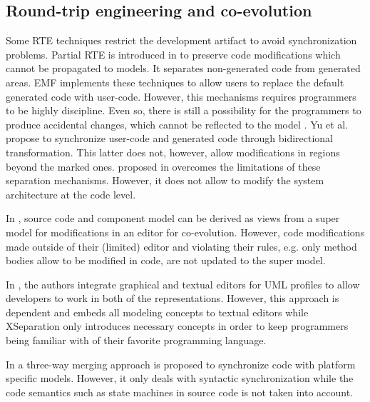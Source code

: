\subsection{Round-trip engineering and co-evolution}
Some RTE techniques restrict the development artifact to avoid
synchronization problems.
Partial RTE is introduced in \cite{czarnecki_multi-level_2006} to preserve code modifications which cannot be propagated to models.
It separates non-generated code from generated areas. 
EMF implements these techniques to allow users to replace the default generated code with user-code.
However, this mechanisms requires programmers to be highly discipline.
Even so, there is still a possibility for the programmers to produce accidental changes, which cannot be reflected to the model \cite{zheng2012enhancing}.
Yu et al. \cite{yu2012maintaining} propose to synchronize user-code and generated code through bidirectional transformation.
This latter does not, however, allow modifications in regions beyond the marked ones. 
 proposed in \cite{zheng2012enhancing} overcomes the limitations of these separation mechanisms.
However, %
it does not allow to modify the system architecture at the code level.  




In \cite{kramer2015change}, source code and component model can be derived as views from a super model for modifications in an editor for co-evolution.
However, code modifications made outside of their (limited) editor and violating their rules, e.g. only method bodies allow to be modified in code, are not updated to the super model. 
 
In \cite{Maro:2015:IGT:2814251.2814253}, the authors integrate graphical and textual editors for UML profiles to allow developers to work in both of the representations.
However, this approach is dependent and embeds all modeling concepts to textual editors while XSeparation only introduces necessary concepts in order to keep programmers being familiar with of their favorite programming language.

In \cite{angyal_synchronizing_2008} a three-way merging approach is proposed to synchronize code with platform specific models.
However, it only deals with syntactic synchronization while the code semantics such as state machines in source code is not taken into account.


